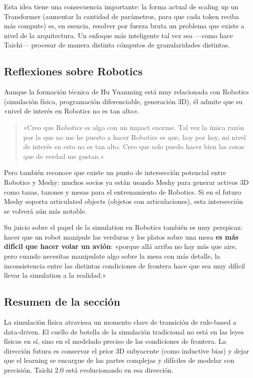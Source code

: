 Esta idea tiene una consecuencia importante: la forma actual de scaling up un Transformer (aumentar la cantidad de parámetros, para que cada token reciba más compute) es, en esencia, resolver por fuerza bruta un problema que existe a nivel de la arquitectura. Un enfoque más inteligente tal vez sea —como hace Taichi— procesar de manera distinta cómputos de granularidades distintas.

\subsection{Reflexiones sobre Robotics}

Aunque la formación técnica de Hu Yuanming está muy relacionada con Robotics (simulación física, programación diferenciable, generación 3D), él admite que su «nivel de interés en Robotics no es tan alto».

\begin{quote}
«Creo que Robotics es algo con un impact enorme. Tal vez la única razón por la que no me he puesto a hacer Robotics es que, hoy por hoy, mi nivel de interés en esto no es tan alto. Creo que solo puedo hacer bien las cosas que de verdad me gustan.»
\end{quote}

Pero también reconoce que existe un punto de intersección potencial entre Robotics y Meshy: muchos socios ya están usando Meshy para generar activos 3D como tazas, tazones y mesas para el entrenamiento de Robotics. Si en el futuro Meshy soporta articulated objects (objetos con articulaciones), esta intersección se volverá aún más notable.

Su juicio sobre el papel de la simulation en Robotics también es muy perspicaz: hacer que un robot manipule las verduras y los platos sobre una mesa \textbf{es más difícil que hacer volar un avión}: «porque allá arriba no hay más que aire, pero cuando necesitas manipulate algo sobre la mesa con más detalle, la inconsistencia entre las distintas condiciones de frontera hace que sea muy difícil llevar la simulation a la realidad.»

\subsection{Resumen de la sección}

La simulación física atraviesa un momento clave de transición de rule-based a data-driven. El cuello de botella de la simulación tradicional no está en las leyes físicas en sí, sino en el modelado preciso de las condiciones de frontera. La dirección futura es conservar el prior 3D subyacente (como inductive bias) y dejar que el learning se encargue de las partes complejas y difíciles de modelar con precisión. Taichi 2.0 está evolucionando en esa dirección.
